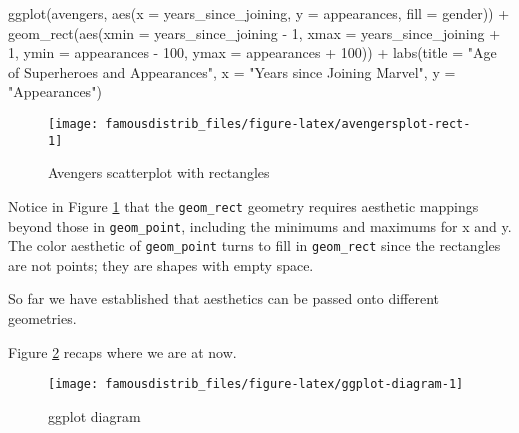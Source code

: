 \documentclass[
]{article}
\newenvironment{Shaded}{\begin{snugshade}}{\end{snugshade}}
\newcommand{\AttributeTok}[1]{\textcolor[rgb]{0.77,0.63,0.00}{#1}}
\newcommand{\DecValTok}[1]{\textcolor[rgb]{0.00,0.00,0.81}{#1}}
\newcommand{\FunctionTok}[1]{\textcolor[rgb]{0.00,0.00,0.00}{#1}}
\newcommand{\NormalTok}[1]{#1}
\newcommand{\SpecialCharTok}[1]{\textcolor[rgb]{0.00,0.00,0.00}{#1}}
\newcommand{\StringTok}[1]{\textcolor[rgb]{0.31,0.60,0.02}{#1}}
\begin{document}
\begin{Shaded}
\begin{Highlighting}[]
\FunctionTok{ggplot}\NormalTok{(avengers, }\FunctionTok{aes}\NormalTok{(}\AttributeTok{x =}\NormalTok{ years\_since\_joining,}
                     \AttributeTok{y =}\NormalTok{ appearances,}
                     \AttributeTok{fill =}\NormalTok{ gender)) }\SpecialCharTok{+}
  \FunctionTok{geom\_rect}\NormalTok{(}\FunctionTok{aes}\NormalTok{(}\AttributeTok{xmin =}\NormalTok{ years\_since\_joining }\SpecialCharTok{{-}} \DecValTok{1}\NormalTok{,}
                \AttributeTok{xmax =}\NormalTok{ years\_since\_joining }\SpecialCharTok{+} \DecValTok{1}\NormalTok{,}
                \AttributeTok{ymin =}\NormalTok{ appearances }\SpecialCharTok{{-}} \DecValTok{100}\NormalTok{,}
                \AttributeTok{ymax =}\NormalTok{ appearances }\SpecialCharTok{+} \DecValTok{100}\NormalTok{)) }\SpecialCharTok{+}
    \FunctionTok{labs}\NormalTok{(}\AttributeTok{title =} \StringTok{"\textquotesingle{}Age\textquotesingle{} of Superheroes and Appearances"}\NormalTok{,}
       \AttributeTok{x =} \StringTok{"Years since Joining Marvel"}\NormalTok{,}
       \AttributeTok{y =} \StringTok{"Appearances"}\NormalTok{)}
\end{Highlighting}
\end{Shaded}

\begin{figure}

{\centering \texttt{[image: famousdistrib\_files/figure-latex/avengersplot-rect-1]} 

}

\caption{Avengers scatterplot with rectangles}\label{fig:avengersplot-rect}
\end{figure}

Notice in Figure \ref{fig:avengersplot-rect} that the \texttt{geom\_rect} geometry requires aesthetic mappings beyond those in \texttt{geom\_point}, including the minimums and maximums for x and y. The color aesthetic of \texttt{geom\_point} turns to fill in \texttt{geom\_rect} since the rectangles are not points; they are shapes with empty space.

So far we have established that aesthetics can be passed onto different geometries.

Figure \ref{fig:ggplot-diagram} recaps where we are at now.

\begin{figure}

{\centering \texttt{[image: famousdistrib\_files/figure-latex/ggplot-diagram-1]} 

}

\caption{ggplot diagram}\label{fig:ggplot-diagram}
\end{figure}
\end{document}
